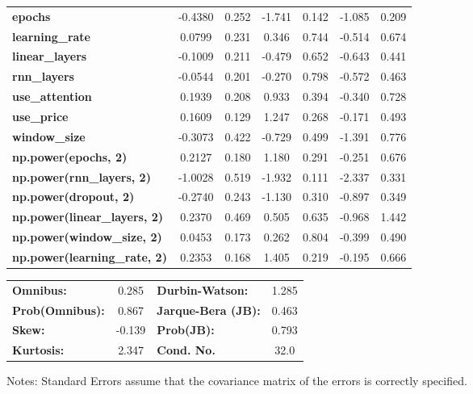 \begin{center}
\begin{tabular}{lcccccc}
\textbf{epochs}                            &      -0.4380  &        0.252     &    -1.741  &         0.142        &       -1.085    &        0.209     \\
\textbf{learning\_rate}                    &       0.0799  &        0.231     &     0.346  &         0.744        &       -0.514    &        0.674     \\
\textbf{linear\_layers}                    &      -0.1009  &        0.211     &    -0.479  &         0.652        &       -0.643    &        0.441     \\
\textbf{rnn\_layers}                       &      -0.0544  &        0.201     &    -0.270  &         0.798        &       -0.572    &        0.463     \\
\textbf{use\_attention}                    &       0.1939  &        0.208     &     0.933  &         0.394        &       -0.340    &        0.728     \\
\textbf{use\_price}                        &       0.1609  &        0.129     &     1.247  &         0.268        &       -0.171    &        0.493     \\
\textbf{window\_size}                      &      -0.3073  &        0.422     &    -0.729  &         0.499        &       -1.391    &        0.776     \\
\textbf{np.power(epochs, 2)}               &       0.2127  &        0.180     &     1.180  &         0.291        &       -0.251    &        0.676     \\
\textbf{np.power(rnn\_layers, 2)}          &      -1.0028  &        0.519     &    -1.932  &         0.111        &       -2.337    &        0.331     \\
\textbf{np.power(dropout, 2)}              &      -0.2740  &        0.243     &    -1.130  &         0.310        &       -0.897    &        0.349     \\
\textbf{np.power(linear\_layers, 2)}       &       0.2370  &        0.469     &     0.505  &         0.635        &       -0.968    &        1.442     \\
\textbf{np.power(window\_size, 2)}         &       0.0453  &        0.173     &     0.262  &         0.804        &       -0.399    &        0.490     \\
\textbf{np.power(learning\_rate, 2)}       &       0.2353  &        0.168     &     1.405  &         0.219        &       -0.195    &        0.666     \\
\bottomrule
\end{tabular}
\begin{tabular}{lclc}
\textbf{Omnibus:}       &  0.285 & \textbf{  Durbin-Watson:     } &    1.285  \\
\textbf{Prob(Omnibus):} &  0.867 & \textbf{  Jarque-Bera (JB):  } &    0.463  \\
\textbf{Skew:}          & -0.139 & \textbf{  Prob(JB):          } &    0.793  \\
\textbf{Kurtosis:}      &  2.347 & \textbf{  Cond. No.          } &     32.0  \\
\bottomrule
\end{tabular}
\end{center}

Notes: \newline
 [1] Standard Errors assume that the covariance matrix of the errors is correctly specified.